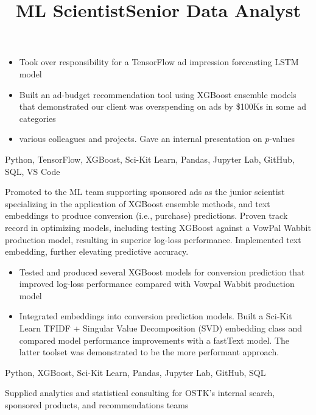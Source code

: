 \documentclass[resmargin, centered, 10pt]{res}
\begin{document}
\begin{resume}
\begin{position}
	\begin{itemize}
		\item {} Took over responsibility for a TensorFlow ad impression forecasting LSTM model
		\item {} Built an ad-budget recommendation tool using XGBoost ensemble models that demonstrated our client was overspending on ads by \$100Ks in some ad categories
		\item {} various colleagues and projects. Gave an internal presentation on $p$-values
	\end{itemize}

	 Python, TensorFlow, XGBoost, Sci-Kit Learn, Pandas, Jupyter Lab, GitHub, SQL, VS Code
\end{position}

\title{ML Scientist}
\begin{position}
	Promoted to the ML team supporting sponsored ads as the junior scientist specializing in the application of XGBoost ensemble methods, and text embeddings to produce conversion (i.e., purchase) predictions. Proven track record in optimizing models, including testing XGBoost against a VowPal Wabbit production model, resulting in superior log-loss performance. Implemented text embedding, further elevating predictive accuracy.

	\begin{itemize}
		\item {} Tested and produced several XGBoost models for conversion prediction that improved log-loss performance compared with Vowpal Wabbit production model
		\item {} Integrated embeddings into conversion prediction models. Built a Sci-Kit Learn TFIDF + Singular Value Decomposition (SVD) embedding class and compared model performance improvements with a fastText model. The latter toolset was demonstrated to be the more performant approach.
	\end{itemize}

	 Python, XGBoost, Sci-Kit Learn, Pandas, Jupyter Lab, GitHub, SQL
\end{position}

\title{Senior Data Analyst}
\begin{position}
	\sloppy Supplied analytics and statistical consulting for OSTK's internal search, sponsored products, and recommendations teams \par


\end{position}
\end{resume}
\end{document}
